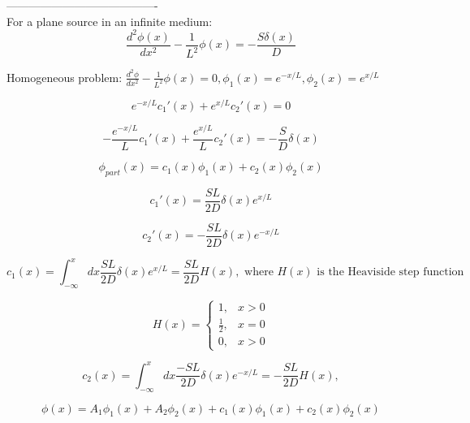 \documentclass[12pt]{article}
\begin{document}
----------------------------------------\\
For a plane source in an infinite medium:
\begin{equation*}
\frac{d^2\phi(x)}{dx^2} - \frac{1}{L^2}\phi(x) = -\frac{S\delta(x)}{D}
\end{equation*}

Homogeneous problem: $\frac{d^2\phi}{dx^2} - \frac{1}{L^2}\phi(x)=0,\phi_1(x)=e^{-x/L},\phi_2(x)=e^{x/L}$

\begin{equation*}
e^{-x/L}c_1'(x) + e^{x/L}c_2'(x) = 0
\end{equation*}

\begin{equation*}
-\frac{e^{-x/L}}{L}c_1'(x) + \frac{e^{x/L}}{L}c_2'(x) = -\frac{S}{D}\delta(x)
\end{equation*}

\begin{equation*}
\phi_{part}(x) = c_1(x)\phi_1(x) + c_2(x)\phi_2(x)
\end{equation*}

\begin{equation*}
c_1'(x) = \frac{SL}{2D}\delta(x)e^{x/L}
\end{equation*}

\begin{equation*}
c_2'(x) = -\frac{SL}{2D}\delta(x)e^{-x/L}
\end{equation*}

\begin{equation*}
c_1(x) = \int_{-\infty}^x dx\frac{SL}{2D}\delta(x)e^{x/L} = \frac{SL}{2D}H(x),
\text{ where $H(x)$ is the Heaviside step function}
\end{equation*}

\begin{equation*}
  H(x)=\begin{cases}
    1, & x > 0 \\
    \tfrac{1}{2}, & x = 0 \\
    0, & x > 0
  \end{cases}
\end{equation*}

\begin{equation*}
c_2(x) = \int_{-\infty}^x dx\frac{-SL}{2D}\delta(x)e^{-x/L} = -\frac{SL}{2D}H(x),
\end{equation*}

\begin{equation*}
\phi(x) = A_1\phi_1(x) + A_2\phi_2(x) + c_1(x)\phi_1(x) + c_2(x)\phi_2(x)
\end{equation*}
\end{document}
